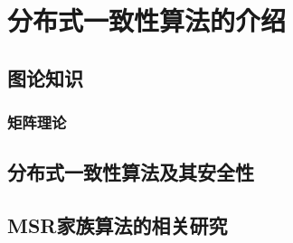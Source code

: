 
\chapter{分布式一致性算法的介绍}

\section{图论知识}

\subsection{矩阵理论}


\section{分布式一致性算法及其安全性}

\section{MSR家族算法的相关研究}




